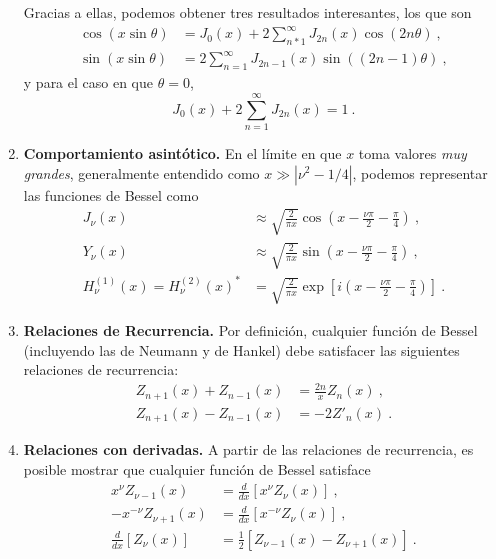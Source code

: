 \begin{propiedad}
\begin{enumerate}
        Gracias a ellas, podemos obtener tres resultados interesantes, los que son 
        \begin{align}
            \cos(x \sin \theta) & = J_0(x) + 2 \sum_{n*1}^\infty J_{2n}(x) \cos(2n\theta) \ , \\
            \sin(x \sin \theta) & = 2 \sum_{n=1}^\infty J_{2n-1}(x) \sin((2n-1)\theta) \ ,
        \end{align}
        y para el caso en que $\theta = 0$, 
        \begin{equation}
            J_0(x) + 2\sum_{n=1}^\infty J_{2n}(x) = 1 \ .
        \end{equation}
        \item \textbf{Comportamiento asintótico.} En el límite en que $x$ toma valores \emph{muy grandes}, generalmente entendido como $x \gg |\nu^2 - 1/4|$, podemos representar las funciones de Bessel como
        \begin{align}
            J_\nu(x) & \approx \sqrt{\frac{2}{\pi x}} \cos\left( x - \frac{\nu \pi}{2} - \frac{\pi}{4} \right) \ , \\
            Y_\nu(x) & \approx \sqrt{\frac{2}{\pi x}} \sin\left( x - \frac{\nu \pi}{2} - \frac{\pi}{4} \right) \ , \\
            H^{(1)}_\nu(x) = H^{(2)}_\nu(x)^\ast & = \sqrt{\frac{2}{\pi x}} \exp\left[ i \left( x - \frac{\nu \pi}{2} - \frac{\pi}{4} \right) \right] \ .
        \end{align}
        \item \textbf{Relaciones de Recurrencia.} Por definición, cualquier función de Bessel (incluyendo las de Neumann y de Hankel) debe satisfacer las siguientes relaciones de recurrencia:
        \begin{align}
            Z_{n+1}(x) + Z_{n-1}(x) & = \frac{2n}{x} Z_n(x) \ , \\
            Z_{n+1}(x) - Z_{n-1}(x) & = -2 Z'_n(x) \ . 
        \end{align}

        \item \textbf{Relaciones con derivadas.} A partir de las relaciones de recurrencia, es posible mostrar que cualquier función de Bessel satisface
        \begin{align}
            x^\nu Z_{\nu-1}(x) & = \frac{d}{dx}\left[ x^\nu Z_\nu(x) \right] \ , \\
            -x^{-\nu} Z_{\nu+1}(x) & = \frac{d}{dx}\left[ x^{-\nu} Z_\nu(x) \right] \ , \\
            \frac{d}{dx} \left[ Z_\nu(x) \right] & = \frac{1}{2} \left[ Z_{\nu-1}(x) - Z_{\nu+1}(x) \right] \ .
        \end{align}
    \end{enumerate}
\end{propiedad}

